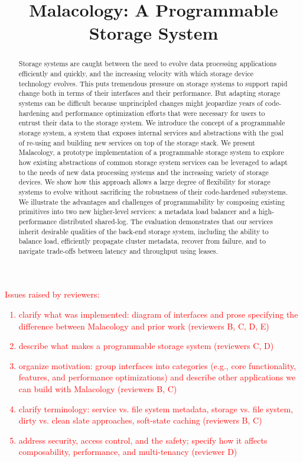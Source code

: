\documentclass[preprint]{sigplanconf-eurosys}
\title{Malacology: A Programmable Storage System}
\date{}
\begin{document}
\maketitle

\begin{notes}
\textcolor{red}{
\noindent Issues raised by reviewers:
\begin{enumerate}
  \item clarify what was implemented: diagram of interfaces and prose
  specifying the difference between Malacology and prior work (reviewers B, C,
  D, E)
  \item describe what makes a programmable storage system (reviewers C, D)
  \item organize motivation: group interfaces into categories (e.g., core
  functionality, features, and performance optimizations) and describe other
  applications we can build with Malacology (reviewers B, C)
  \item clarify terminology: service vs. file system metadata, storage vs.
  file system, dirty vs. clean slate approaches, soft-state caching (reviewers
  B, C)
  \item address security, access control, and the safety; specify how it
  affects composability, performance, and multi-tenancy (reviewer D)
\end{enumerate}
}
\end{notes}

\begin{abstract} Storage systems are caught between the need to evolve data
processing applications efficiently and quickly, and the increasing velocity
with which storage device technology evolves. This puts tremendous pressure on
storage systems to support rapid change both in terms of their interfaces and
their performance. But adapting storage systems can be difficult because
unprincipled changes might jeopardize years of code-hardening and performance
optimization efforts that were necessary for users to entrust their data to the
storage system. We introduce the concept of a programmable storage system, a
system that exposes internal services and abstractions with the goal of
re-using and building new services on top of the storage stack. We present
Malacology, a prototype implementation of a programmable storage system to
explore how existing abstractions of common storage system services can be
leveraged to adapt to the needs of new data processing systems and the
increasing variety of storage devices. We show how this approach allows a large
degree of flexibility for storage systems to evolve without sacrificing the
robustness of their code-hardened subsystems. We illustrate the advantages and
challenges of programmability by composing existing primitives into two new
higher-level services: a metadata load balancer and a high-performance
distributed shared-log. The evaluation demonstrates that our services inherit
desirable qualities of the back-end storage system, including the ability to
balance load, efficiently propagate cluster metadata, recover from failure, and
to navigate trade-offs between latency and throughput using leases.
\end{abstract}
\end{document}
